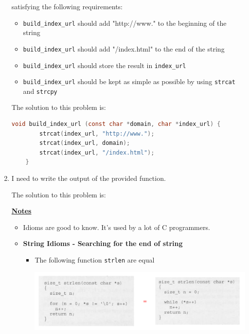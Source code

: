 \documentclass[12pt]{article}
\begin{document}
\begin{enumerate}[1.]
    \bigskip

    satisfying the following requirements:

    \begin{itemize}
        \item \texttt{build\_index\_url} should add "http://www." to the beginning of the string
        \item \texttt{build\_index\_url} should add "/index.html" to the end of the string
        \item \texttt{build\_index\_url} should store the result in \texttt{index\_url}
        \item \texttt{build\_index\_url} should be kept as simple as possible by using \texttt{strcat} and \texttt{strcpy}
    \end{itemize}

    \bigskip

    The solution to this problem is:

    \bigskip


\begin{lstlisting}[language=c]
    void build_index_url (const char *domain, char *index_url) {
        strcat(index_url, "http://www.");
        strcat(index_url, domain);
        strcat(index_url, "/index.html");
    }
\end{lstlisting}

    \item

    I need to write the output of the provided function.

    \bigskip

    The solution to this problem is:

    \bigskip

    \underline{\textbf{Notes}}

    \bigskip

    \begin{itemize}
        \item Idioms are good to know. It's used by a lot of C programmers.
        \item \textbf{String Idioms - Searching for the end of string}

        \begin{itemize}
            \item The following function \texttt{strlen} are equal

            \begin{center}
            \includegraphics[width=0.9\linewidth]{images/review_6_solution_6.png}
            \end{center}


\end{itemize}
\end{itemize}
\end{enumerate}
\end{document}
